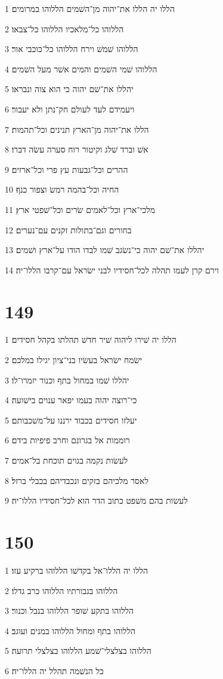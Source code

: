 \par 1 הללו יה הללו את־יהוה מן־השׁמים הללוהו במרומים׃
\par 2 הללוהו כל־מלאכיו הללוהו כל־צבאו׃
\par 3 הללוהו שׁמשׁ וירח הללוהו כל־כוכבי אור׃
\par 4 הללוהו שׁמי השׁמים והמים אשׁר מעל השׁמים׃
\par 5 יהללו את־שׁם יהוה כי הוא צוה ונבראו׃
\par 6 ויעמידם לעד לעולם חק־נתן ולא יעבור׃
\par 7 הללו את־יהוה מן־הארץ תנינים וכל־תהמות׃
\par 8 אשׁ וברד שׁלג וקיטור רוח סערה עשׂה דברו׃
\par 9 ההרים וכל־גבעות עץ פרי וכל־ארזים׃
\par 10 החיה וכל־בהמה רמשׂ וצפור כנף׃
\par 11 מלכי־ארץ וכל־לאמים שׂרים וכל־שׁפטי ארץ׃
\par 12 בחורים וגם־בתולות זקנים עם־נערים׃
\par 13 יהללו את־שׁם יהוה כי־נשׂגב שׁמו לבדו הודו על־ארץ ושׁמים׃
\par 14 וירם קרן לעמו תהלה לכל־חסידיו לבני ישׂראל עם־קרבו הללו־יה׃

\chapter{149}

\par 1 הללו יה שׁירו ליהוה שׁיר חדשׁ תהלתו בקהל חסידים׃
\par 2 ישׂמח ישׂראל בעשׂיו בני־ציון יגילו במלכם׃
\par 3 יהללו שׁמו במחול בתף וכנור יזמרו־לו׃
\par 4 כי־רוצה יהוה בעמו יפאר ענוים בישׁועה׃
\par 5 יעלזו חסידים בכבוד ירננו על־משׁכבותם׃
\par 6 רוממות אל בגרונם וחרב פיפיות בידם׃
\par 7 לעשׂות נקמה בגוים תוכחת בל־אמים׃
\par 8 לאסר מלכיהם בזקים ונכבדיהם בכבלי ברזל׃
\par 9 לעשׂות בהם משׁפט כתוב הדר הוא לכל־חסידיו הללו־יה׃

\chapter{150}

\par 1 הללו יה הללו־אל בקדשׁו הללוהו ברקיע עזו׃
\par 2 הללוהו בגבורתיו הללוהו כרב גדלו׃
\par 3 הללוהו בתקע שׁופר הללוהו בנבל וכנור׃
\par 4 הללוהו בתף ומחול הללוהו במנים ועוגב׃
\par 5 הללוהו בצלצלי־שׁמע הללוהו בצלצלי תרועה׃
\par 6 כל הנשׁמה תהלל יה הללו־יה׃



